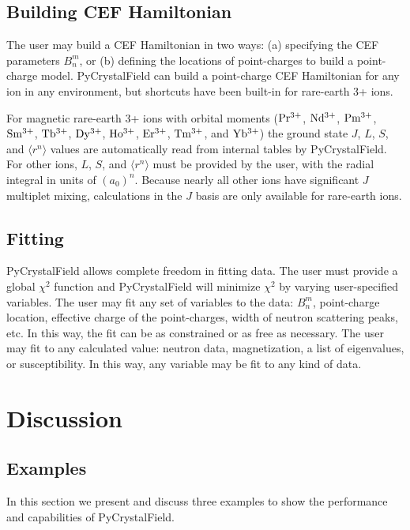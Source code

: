 \documentclass[twocolumn,english,prb]{revtex4-2}
\begin{document}
\subsection{Building CEF Hamiltonian}

The user may build a CEF Hamiltonian in two ways: (a) specifying the CEF parameters $B_n^m$, or (b) defining the locations of point-charges to build a point-charge model. 
PyCrystalField can build a point-charge CEF Hamiltonian for any ion in any environment, but shortcuts have been built-in for rare-earth 3+ ions.

For magnetic rare-earth 3+ ions with orbital moments ($\rm Pr^{3+}$, $\rm Nd^{3+}$, $\rm Pm^{3+}$, $\rm Sm^{3+}$, $\rm Tb^{3+}$, $\rm Dy^{3+}$, $\rm Ho^{3+}$, $\rm Er^{3+}$, $\rm Tm^{3+}$, and $\rm Yb^{3+}$) the ground state $J$, $L$, $S$, and $\langle r^{n} \rangle$ values are automatically read from internal tables by PyCrystalField.
For other ions, $L$, $S$, and  $\langle r^{n} \rangle$ must be provided by the user, with the radial integral in units of $(a_0)^n$. 
Because nearly all other ions have significant $J$ multiplet mixing, calculations in the $J$ basis are only available for rare-earth ions.

\subsection{Fitting}

PyCrystalField allows complete freedom in fitting data. The user must provide a global $\chi^2$ function and PyCrystalField will minimize $\chi^2$ by varying user-specified variables. The user may fit any set of variables to the data: $B_n^m$, point-charge location, effective charge of the point-charges, width of neutron scattering peaks, etc. In this way, the fit can be as constrained or as free as necessary. The user may fit to any calculated value: neutron data, magnetization, a list of eigenvalues, or susceptibility. In this way, any variable may be fit to any kind of data.

\section{Discussion}

\subsection{Examples}

In this section we present and discuss three examples to show the performance and capabilities of PyCrystalField.
\end{document}
